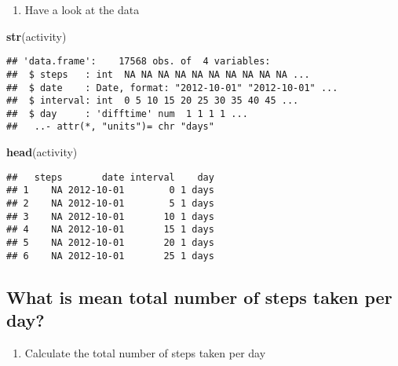 \documentclass[
]{article}
\newenvironment{Shaded}{\begin{snugshade}}{\end{snugshade}}
\newcommand{\DataTypeTok}[1]{\textcolor[rgb]{0.13,0.29,0.53}{#1}}
\newcommand{\KeywordTok}[1]{\textcolor[rgb]{0.13,0.29,0.53}{\textbf{#1}}}
\newcommand{\NormalTok}[1]{#1}
\newcommand{\OperatorTok}[1]{\textcolor[rgb]{0.81,0.36,0.00}{\textbf{#1}}}
\newcommand{\OtherTok}[1]{\textcolor[rgb]{0.56,0.35,0.01}{#1}}
\providecommand{\tightlist}{%
  \setlength{\itemsep}{0pt}\setlength{\parskip}{0pt}}
\begin{document}
\begin{enumerate}
\def\labelenumi{\arabic{enumi}.}
\setcounter{enumi}{3}
\tightlist
\item
  Have a look at the data
\end{enumerate}

\begin{Shaded}
\begin{Highlighting}[]
\KeywordTok{str}\NormalTok{(activity)}
\end{Highlighting}
\end{Shaded}

\begin{verbatim}
## 'data.frame':    17568 obs. of  4 variables:
##  $ steps   : int  NA NA NA NA NA NA NA NA NA NA ...
##  $ date    : Date, format: "2012-10-01" "2012-10-01" ...
##  $ interval: int  0 5 10 15 20 25 30 35 40 45 ...
##  $ day     : 'difftime' num  1 1 1 1 ...
##   ..- attr(*, "units")= chr "days"
\end{verbatim}

\begin{Shaded}
\begin{Highlighting}[]
\KeywordTok{head}\NormalTok{(activity)}
\end{Highlighting}
\end{Shaded}

\begin{verbatim}
##   steps       date interval    day
## 1    NA 2012-10-01        0 1 days
## 2    NA 2012-10-01        5 1 days
## 3    NA 2012-10-01       10 1 days
## 4    NA 2012-10-01       15 1 days
## 5    NA 2012-10-01       20 1 days
## 6    NA 2012-10-01       25 1 days
\end{verbatim}

\hypertarget{what-is-mean-total-number-of-steps-taken-per-day}{%
\subsection{What is mean total number of steps taken per
day?}\label{what-is-mean-total-number-of-steps-taken-per-day}}

\begin{enumerate}
\def\labelenumi{\arabic{enumi}.}
\tightlist
\item
  Calculate the total number of steps taken per day
\end{enumerate}

\begin{Shaded}
\end{Shaded}
\end{document}
